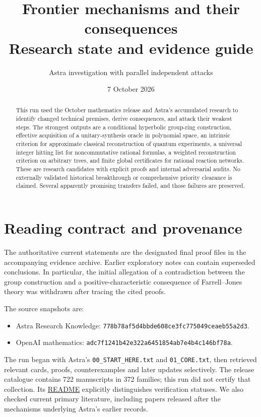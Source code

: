\documentclass[11pt]{article}
\title{Frontier mechanisms and their consequences\\Research state and evidence guide}
\author{Astra investigation with parallel independent attacks}
\date{7 October 2026}
\begin{document}
\maketitle
\begin{abstract}
This run used the October mathematics release and Astra's accumulated research to identify changed technical premises, derive consequences, and attack their weakest steps. The strongest outputs are a conditional hyperbolic group-ring construction, effective acquisition of a unitary-synthesis oracle in polynomial space, an intrinsic criterion for approximate classical reconstruction of quantum experiments, a universal integer hitting list for noncommutative rational formulas, a weighted reconstruction criterion on arbitrary trees, and finite global certificates for rational reaction networks. These are research candidates with explicit proofs and internal adversarial audits. No externally validated historical breakthrough or comprehensive priority clearance is claimed. Several apparently promising transfers failed, and those failures are preserved.
\end{abstract}

\section{Reading contract and provenance}
The authoritative current statements are the designated final proof files in the accompanying evidence archive. Earlier exploratory notes can contain superseded conclusions. In particular, the initial allegation of a contradiction between the group construction and a positive-characteristic consequence of Farrell--Jones theory was withdrawn after tracing the cited proofs.

The source snapshots are:
\begin{itemize}
\item Astra Research Knowledge: \texttt{778b78af5d4bbde608ce3fc775049ceaeb55a2d3}.
\item OpenAI mathematics: \texttt{adc7f1241b42e322a6451854ab7e4b4c146bf78a}.
\end{itemize}
The run began with Astra's \texttt{00\_START\_HERE.txt} and \texttt{01\_CORE.txt}, then retrieved relevant cards, proofs, counterexamples and later updates selectively. The release catalogue contains 722 manuscripts in 372 families; this run did not certify that collection. Its \href{https://github.com/openai/math}{README} explicitly distinguishes verification statuses. We also checked current primary literature, including papers released after the mechanisms underlying Astra's earlier records.
\end{document}
